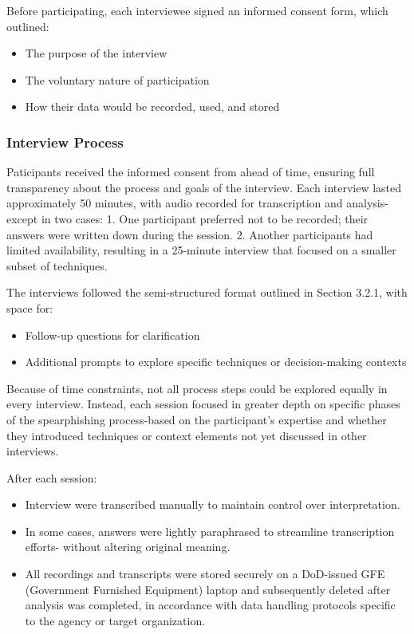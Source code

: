 Before participating, each interviewee signed an informed consent form, which outlined:
\begin{itemize}
    \item The purpose of the interview
    \item The voluntary nature of participation
    \item How their data would be recorded, used, and stored

\end{itemize}

\subsubsection{Interview Process}
Paticipants received the informed consent from ahead of time, ensuring full transparency about the process and goals of the interview. Each interview lasted approximately 50 minutes, with audio recorded for transcription and analysis-except in two cases:
1. One participant preferred not to be recorded; their answers were written down during the session.
2. Another participants had limited availability, resulting in a 25-minute interview that focused on a smaller subset of techniques.

The interviews followed the semi-structured format outlined in Section 3.2.1, with space for:
\begin{itemize}
    \item Follow-up questions for clarification
    \item Additional prompts to explore specific techniques or decision-making contexts

\end{itemize}

Because of time constraints, not all process steps could be explored equally in every interview. Instead, each session focused in greater depth on specific phases of the spearphishing process-based on the participant's expertise and whether they introduced techniques or context elements not yet discussed in other interviews.

After each session:
\begin{itemize}
    \item Interview were transcribed manually to maintain control over interpretation.
    \item In some cases, answers were lightly paraphrased to streamline transcription efforts- without altering original meaning.
    \item All recordings and transcripts were stored securely on a DoD-issued GFE (Government Furnished Equipment) laptop and subsequently deleted after analysis was completed, in accordance with data handling protocols specific to the agency or target organization.
\end{itemize}

